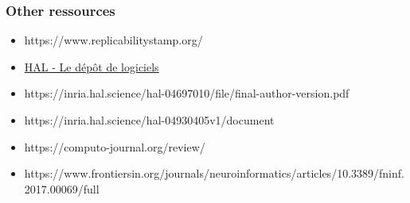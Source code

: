 \begin{frame}[shrink=5]
  \frametitle{Other ressources}

  \begin{itemize}
  \item https://www.replicabilitystamp.org/
  \item \href{https://doc.hal.science/ressources/essentiels/CCSD_essentiels_logiciels.fr.pdf}{HAL - Le dépôt de logiciels}
  \item  https://inria.hal.science/hal-04697010/file/final-author-version.pdf
  \item  https://inria.hal.science/hal-04930405v1/document
  \item  https://computo-journal.org/review/
  \item  https://www.frontiersin.org/journals/neuroinformatics/articles/10.3389/fninf.2017.00069/full
  \end{itemize}

\end{frame}

